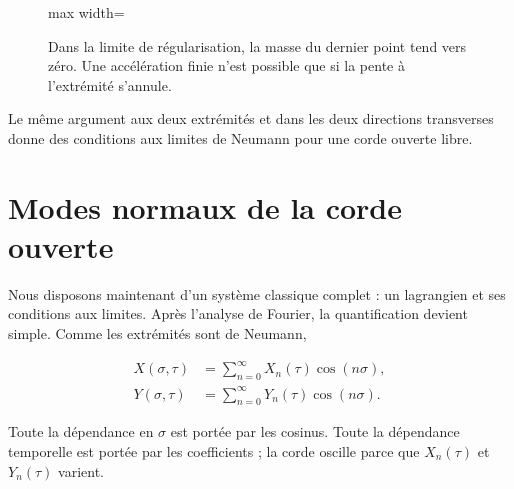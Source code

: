 \begin{figure}[H]
  \centering
  \begin{adjustbox}{max width=\linewidth}
  \end{adjustbox}
  \caption{Dans la limite de régularisation, la masse du dernier point tend vers zéro. Une accélération finie n’est possible que si la pente à l’extrémité s’annule.}
  \label{fig:l02-neumann-redraw}
\end{figure}

Le même argument aux deux extrémités et dans les deux directions transverses donne des conditions aux limites de Neumann pour une corde ouverte libre.

\section{Modes normaux de la corde ouverte}

Nous disposons maintenant d’un système classique complet : un lagrangien et ses conditions aux limites. Après l’analyse de Fourier, la quantification devient simple. Comme les extrémités sont de Neumann,

\begin{align}
  X(\sigma,\tau)
  &=
  \sum_{n=0}^{\infty}X_n(\tau)\cos(n\sigma),
  \label{eq:l02-X-expansion}\\
  Y(\sigma,\tau)
  &=
  \sum_{n=0}^{\infty}Y_n(\tau)\cos(n\sigma).
  \label{eq:l02-Y-expansion}
\end{align}

Toute la dépendance en \(\sigma\) est portée par les cosinus. Toute la dépendance temporelle est portée par les coefficients ; la corde oscille parce que \(X_n(\tau)\) et \(Y_n(\tau)\) varient.

